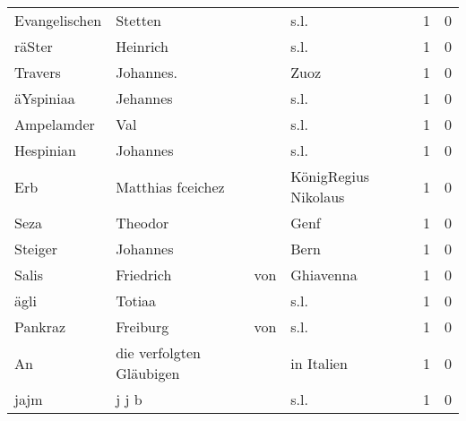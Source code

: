 \begin{tabular}{llllrr}
            Evangelischen &                            Stetten &             &                                        s.l. &          1 &         0 \\
                   räSter &                           Heinrich &             &                                        s.l. &          1 &         0 \\
                  Travers &                          Johannes. &             &                                        Zuoz &          1 &         0 \\
                äYspiniaa &                           Jehannes &             &                                        s.l. &          1 &         0 \\
               Ampelamder &                                Val &             &                                        s.l. &          1 &         0 \\
                Hespinian &                           Johannes &             &                                        s.l. &          1 &         0 \\
                      Erb &                  Matthias fceichez &             &                        KönigRegius Nikolaus &          1 &         0 \\
                     Seza &                            Theodor &             &                                        Genf &          1 &         0 \\
                  Steiger &                           Johannes &             &                                        Bern &          1 &         0 \\
                    Salis &                          Friedrich &         von &                                   Ghiavenna &          1 &         0 \\
                     ägli &                             Totiaa &             &                                        s.l. &          1 &         0 \\
                  Pankraz &                           Freiburg &         von &                                        s.l. &          1 &         0 \\
                       An &           die verfolgten Gläubigen &             &                                  in Italien &          1 &         0 \\
                     jajm &                              j j b &             &                                        s.l. &          1 &         0 \\

\end{tabular}
